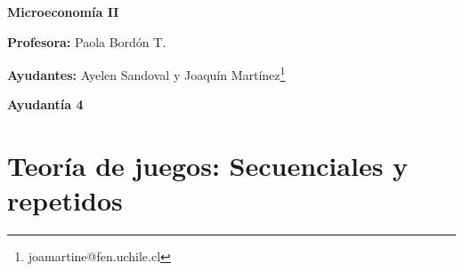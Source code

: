 \documentclass{exam}
\begin{document}
\begin{center}

\LARGE{\textbf{Microeconomía II}}

\medskip
\normalsize \textbf{Profesora:} Paola Bordón T.

\normalsize \textbf{Ayudantes:} Ayelen Sandoval y Joaquín Martínez\footnote{joamartine@fen.uchile.cl}


\medskip
\large{\textbf{Ayudantía 4}}
\end{center}

\tableofcontents

\section{Teoría de juegos: Secuenciales y repetidos}



\end{document}
